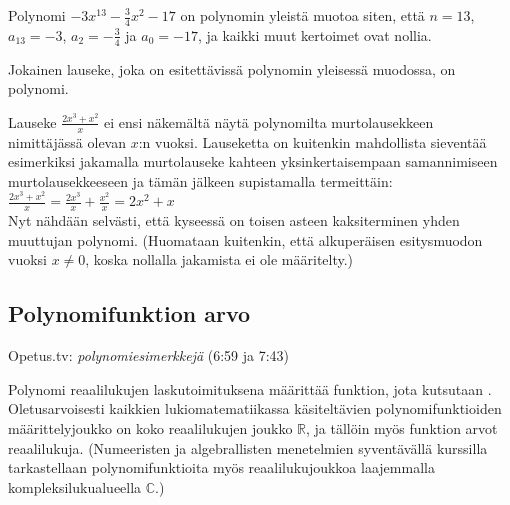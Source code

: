 \begin{esimerkki}

Polynomi $-3x^{13}-\frac{3}{4}x^2-17$ on polynomin yleistä muotoa siten, että $n=13$, $a_{13}=-3$, $a_2=-\frac{3}{4}$ ja $a_0=-17$, ja kaikki muut kertoimet ovat nollia.

\end{esimerkki}
 
Jokainen lauseke, joka on esitettävissä polynomin yleisessä muodossa, on polynomi.

\begin{esimerkki}

Lauseke $\frac{2x^3+x^2}{x}$ ei ensi näkemältä näytä polynomilta murtolausekkeen nimittäjässä olevan $x$:n vuoksi. Lauseketta on kuitenkin mahdollista sieventää esimerkiksi jakamalla murtolauseke kahteen yksinkertaisempaan samannimiseen murtolausekkeeseen ja tämän jälkeen supistamalla termeittäin: \\

$\frac{2x^3+x^2}{x} = \frac{2x^3}{x}+\frac{x^2}{x} = 2x^2+x $ \\

Nyt nähdään selvästi, että kyseessä on toisen asteen kaksiterminen yhden muuttujan polynomi. (Huomataan kuitenkin, että alkuperäisen esitysmuodon vuoksi $x \neq 0$, koska nollalla jakamista ei ole määritelty.)

\end{esimerkki}

\subsection{Polynomifunktion arvo}

{Opetus.tv: \emph{polynomiesimerkkejä} (6:59 ja 7:43)}

Polynomi reaalilukujen laskutoimituksena määrittää funktion, jota kutsutaan . Oletusarvoisesti kaikkien lukiomatematiikassa käsiteltävien polynomifunktioiden määrittelyjoukko on koko reaalilukujen joukko $\mathbb{R}$, ja tällöin myös funktion arvot reaalilukuja. (Numeeristen ja algebrallisten menetelmien syventävällä kurssilla tarkastellaan polynomifunktioita myös reaalilukujoukkoa laajemmalla kompleksilukualueella $\mathbb{C}$.)


